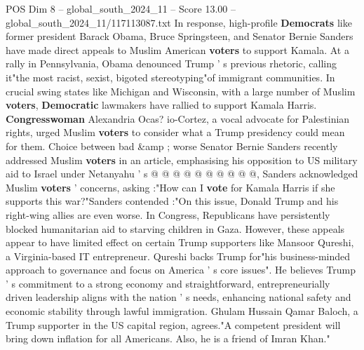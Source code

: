 \begin{textsample}{POS Dim 8 – global\_south\_2024\_11 – Score 13.00 – global\_south\_2024\_11/117113087.txt}
In response, high-profile \textbf{Democrats} like former president Barack Obama, Bruce Springsteen, and Senator Bernie Sanders have made direct appeals to Muslim American \textbf{voters} to support Kamala.
At a rally in Pennsylvania, Obama denounced Trump ' s previous rhetoric, calling it"the most racist, sexist, bigoted stereotyping"of immigrant communities.
In crucial swing states like Michigan and Wisconsin, with a large number of Muslim \textbf{voters}, \textbf{Democratic} lawmakers have rallied to support Kamala Harris. \textbf{Congresswoman} Alexandria Ocas? io-Cortez, a vocal advocate for Palestinian rights, urged Muslim \textbf{voters} to consider what a Trump presidency could mean for them.
Choice between bad \&amp ; worse Senator Bernie Sanders recently addressed Muslim \textbf{voters} in an article, emphasising his opposition to US military aid to Israel under Netanyahu ' s @ @ @ @ @ @ @ @ @ @, Sanders acknowledged Muslim \textbf{voters} ' concerns, asking :"How can I \textbf{vote} for Kamala Harris if she supports this war?"Sanders contended :"On this issue, Donald Trump and his right-wing allies are even worse.
In Congress, Republicans have persistently blocked humanitarian aid to starving children in Gaza.
However, these appeals appear to have limited effect on certain Trump supporters like Mansoor Qureshi, a Virginia-based IT entrepreneur.
Qureshi backs Trump for"his business-minded approach to governance and focus on America ' s core issues".
He believes Trump ' s commitment to a strong economy and straightforward, entrepreneurially driven leadership aligns with the nation ' s needs, enhancing national safety and economic stability through lawful immigration.
Ghulam Hussain Qamar Baloch, a Trump supporter in the US capital region, agrees."A competent president will bring down inflation for all Americans.
Also, he is a friend of Imran Khan."

\end{textsample}
